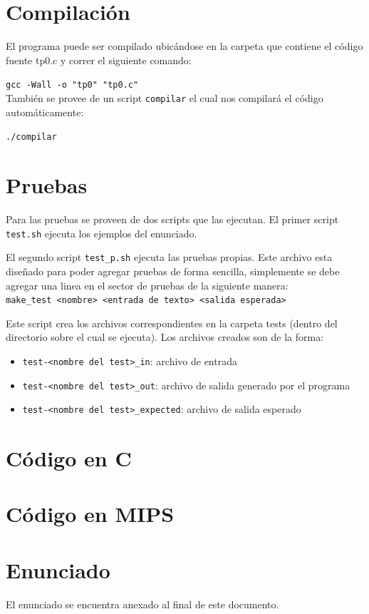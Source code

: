 \documentclass[11pt,a4paper]{article}
\begin{document}
\section{Compilación}
El programa puede ser compilado ubicándose en la carpeta que contiene el código fuente tp0.c y correr el siguiente comando:

\texttt{gcc -Wall -o "tp0" "tp0.c"}\\

También se provee de un script \texttt{compilar} el cual nos compilará el código automáticamente:

\texttt{./compilar}


\section{Pruebas}
Para las pruebas se proveen de dos scripts que las ejecutan.
El primer script \texttt{test.sh} ejecuta los ejemplos del enunciado.

El segundo script \texttt{test\_p.sh} ejecuta las pruebas propias.
Este archivo esta diseñado para poder agregar pruebas de forma sencilla, simplemente se debe agregar una linea en el sector de pruebas de la siguiente manera:\\

\texttt{make\_test <nombre> <entrada de texto> <salida esperada>}

Este script crea los archivos correspondientes en la carpeta tests (dentro del directorio sobre el cual se ejecuta).
Los archivos creados son de la forma:

\begin{itemize}
	\item \texttt{test-<nombre del test>\_in}: archivo de entrada
	\item \texttt{test-<nombre del test>\_out}: archivo de salida generado por el programa
	\item \texttt{test-<nombre del test>\_expected}: archivo de salida esperado
\end{itemize}

\section{Código en C}



\section{Código en MIPS}


\section{Enunciado}
El enunciado se encuentra anexado al final de este documento.
\end{document}
